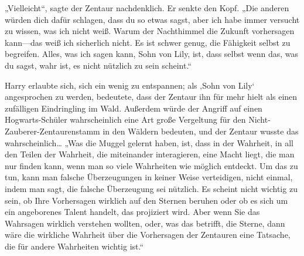 „Vielleicht“, sagte der Zentaur nachdenklich. Er senkte den Kopf.
„Die anderen würden dich dafür schlagen, dass du so etwas sagst, aber ich habe immer versucht zu wissen, was ich nicht weiß. Warum der Nachthimmel die Zukunft vorhersagen kann—das weiß ich sicherlich nicht. Es ist schwer genug, die Fähigkeit selbst zu begreifen. Alles, was ich sagen kann, Sohn von Lily, ist, dass selbst wenn das, was du sagst, wahr ist, es nicht nützlich zu sein scheint.“

Harry erlaubte sich, sich ein wenig zu entspannen; als ‚Sohn von Lily‘ angesprochen zu werden, bedeutete, dass der Zentaur ihn für mehr hielt als einen zufälligen Eindringling im Wald. Außerdem würde der Angriff auf einen Hogwarts-Schüler wahrscheinlich eine Art große Vergeltung für den Nicht-Zauberer-Zentaurenstamm in den Wäldern bedeuten, und der Zentaur wusste das wahrscheinlich…
„Was die Muggel gelernt haben, ist, dass in der Wahrheit, in all den Teilen der Wahrheit, die miteinander interagieren, eine Macht liegt, die man nur finden kann, wenn man so viele Wahrheiten wie möglich entdeckt. Um das zu tun, kann man falsche Überzeugungen in keiner Weise verteidigen, nicht einmal, indem man sagt, die falsche Überzeugung sei nützlich. Es scheint nicht wichtig zu sein, ob Ihre Vorhersagen wirklich auf den Sternen beruhen oder ob es sich um ein angeborenes Talent handelt, das projiziert wird. Aber wenn Sie das Wahrsagen wirklich verstehen wollten, oder, was das betrifft, die Sterne, dann wäre die wirkliche Wahrheit über die Vorhersagen der Zentauren eine Tatsache, die für andere Wahrheiten wichtig ist.“


